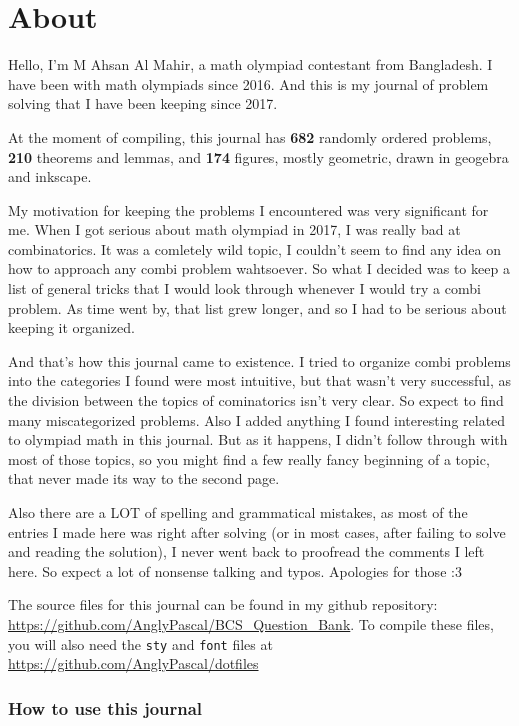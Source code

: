\chapter*{About}  

\thispagestyle{empty}

Hello, I'm M Ahsan Al Mahir, a math olympiad contestant from Bangladesh. I have been with
math olympiads since 2016. And this is my journal of problem solving that I have been
keeping since 2017. 


At the moment of compiling, this journal has \textbf{682} randomly ordered problems,
\textbf{210} theorems and lemmas, and \textbf{174} figures, mostly geometric, drawn in
geogebra and inkscape.

My motivation for keeping the problems I encountered was very significant for me. When I
got serious about math olympiad in 2017, I was really bad at combinatorics. It was a
comletely wild topic, I couldn't seem to find any idea on how to approach any combi
problem wahtsoever. So what I decided was to keep a list of general tricks that I would
look through whenever I would try a combi problem. As time went by, that list grew longer,
and so I had to be serious about keeping it organized.

And that's how this journal came to existence. I tried to organize combi problems into the
categories I found were most intuitive, but that wasn't very successful, as the division
between the topics of cominatorics isn't very clear. So expect to find many miscategorized
problems. Also I added anything I found interesting related to olympiad math in this
journal. But as it happens, I didn't follow through with most of those topics, so you
might find a few really fancy beginning of a topic, that never made its way to the second
page.

Also there are a LOT of spelling and grammatical mistakes, as most of the entries I made
here was right after solving (or in most cases, after failing to solve and reading the
solution), I never went back to proofread the comments I left here. So expect a lot of
nonsense talking and typos. Apologies for those :3 

The source files for this journal can be found in my github repository:
\url{https://github.com/AnglyPascal/BCS_Question_Bank}. To compile these files, you will
also need the \texttt{sty} and \texttt{font} files at
\url{https://github.com/AnglyPascal/dotfiles}

\subsection*{How to use this journal}

